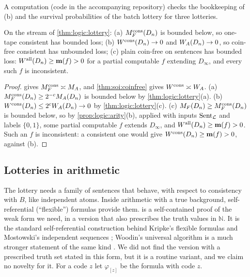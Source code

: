 A computation (code in the accompanying repository) checks the bookkeeping of (b) and the survival probabilities of the batch lottery for three lotteries.

\begin{corollary}\label{cor:logic:versions}
On the stream of \cref{thm:logic:lottery}: (a) $M_{F}^{\mathrm{cons}}(D_n)$ is bounded below, so one-tape consistent \SOIabbr has bounded loss; (b) $W^{\mathrm{cons}}(D_n)\to0$ and $W_{A}(D_n)\to0$, so coin-free consistent \SOIabbr has unbounded loss; (c) plain coin-free \SOIabbr on sentences has bounded loss: $W^{\mathrm{all}}(D_n)\ge\mathbf{m}(f)>0$ for a partial computable $f$ extending $D_\infty$, and every such $f$ is inconsistent.
\end{corollary}

\begin{proof}
 gives $M_{F}^{\mathrm{cons}}\asymp M_{A}$, and \cref{thm:soi:coinfree} gives $W^{\mathrm{cons}}\asymp W_{A}$. (a) $M_{F}^{\mathrm{cons}}(D_n)\ge2^{-c}M_{A}(D_n)$ is bounded below by \cref{thm:logic:lottery}(a). (b) $W^{\mathrm{cons}}(D_n)\le2^cW_{A}(D_n)\to0$ by \cref{thm:logic:lottery}(c). (c) $M_{F}(D_n)\ge M_{F}^{\mathrm{cons}}(D_n)$ is bounded below, so by \cref{prop:logic:arity}(b), applied with inputs $\mathrm{Sent}_{\mathcal L}$ and labels $\{0,1\}$, some partial computable $f$ extends $D_\infty$, and $W^{\mathrm{all}}(D_n)\ge\mathbf{m}(f)>0$. Such an $f$ is inconsistent: a consistent one would give $W^{\mathrm{cons}}(D_n)\ge\mathbf{m}(f)>0$, against (b).
\end{proof}

\subsection{Lotteries in arithmetic}\label{app:logic:arith}

The lottery needs a family of sentences that behave, with respect to consistency with $B$, like independent atoms. Inside arithmetic with a true background, self-referential (``flexible'') formulas provide them.  is a self-contained proof of the weak form we need, in a version that also prescribes the truth values in $\mathbb N$. It is the standard self-referential construction behind Kripke's flexible formulas \citep{kripke1962flexible} and Mostowski's independent sequences \citep{mostowski1961generalization}; Woodin's universal algorithm is a much stronger statement of the same kind \citep{woodin2011potential,blanck2017marginalia,hamkins2018modal}. We did not find the version with a prescribed truth set stated in this form, but it is a routine variant, and we claim no novelty for it. For a code $z$ let $\varphi_{[z]}$ be the formula with code $z$.

